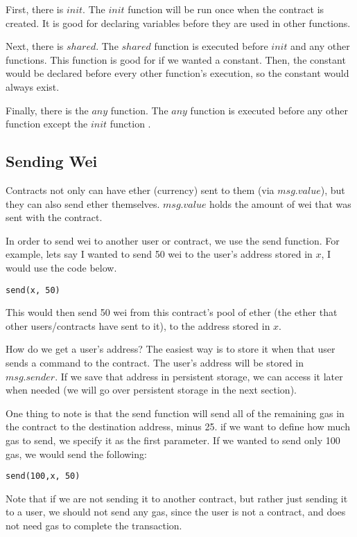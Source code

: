 \documentclass[12pt]{article}
\begin{document}
First, there is $init$. The $init$ function will be run once when the contract is created. It is good for declaring variables before they are used in other functions.

Next, there is $shared$. The $shared$ function is executed before $init$ and any other functions. This function is good for if we wanted a constant. Then, the constant would be declared before every other function's execution, so the constant would always exist.

Finally, there is the $any$ function. The $any$ function is executed before any other function except the $init$ function \cite{Serpent}.

\subsection{Sending Wei}
Contracts not only can have ether (currency) sent to them (via $msg.value$), but they can also send ether themselves. $msg.value$ holds the amount of wei that was sent with the contract.

In order to send wei to another user or contract, we use the send function. For example, lets say I wanted to send 50 wei to the user's address stored in $x$, I would use the code below.

\begin{verbatim}
send(x, 50)
\end{verbatim}

This would then send 50 wei from this contract's pool of ether (the ether that other users/contracts have sent to it), to the address stored in $x$.

How do we get a user's address? The easiest way is to store it when that user sends a command to the contract. The user's address will be stored in $msg.sender$. If we save that address in persistent storage, we can access it later when needed \cite{Serpent} (we will go over persistent storage in the next section).

One thing to note is that the send function will send all of the remaining gas in the contract to the destination address, minus 25. if we want to define how much gas to send, we specify it as the first parameter. If we wanted to send only 100 gas, we would send the following: 

\begin{verbatim}
send(100,x, 50)
\end{verbatim}

Note that if we are not sending it to another contract, but rather just sending it to a user, we should not send any gas, since the user is not a contract, and does not need gas to complete the transaction. 
\end{document}
